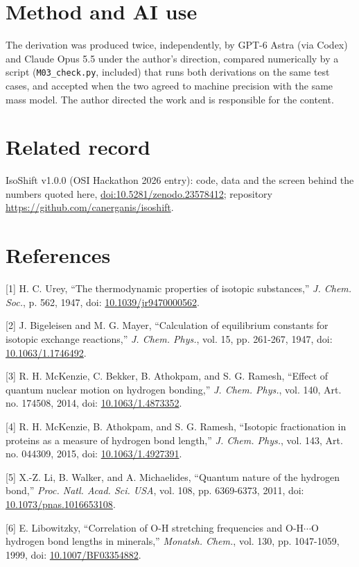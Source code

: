 \documentclass[11pt,a4paper]{article}
\begin{document}
\section*{Method and AI use}
The derivation was produced twice, independently, by GPT-6 Astra (via Codex) and Claude Opus 5.5 under the author's direction, compared numerically by a script (\texttt{M03\_check.py}, included) that runs both derivations on the same test cases, and accepted when the two agreed to machine precision with the same mass model. The author directed the work and is responsible for the content.

\section*{Related record}
IsoShift v1.0.0 (OSI Hackathon 2026 entry): code, data and the screen behind the numbers quoted here, \href{https://doi.org/10.5281/zenodo.23578412}{doi:10.5281/zenodo.23578412}; repository \url{https://github.com/canerganis/isoshift}.

\section*{References}
[1] H. C. Urey, ``The thermodynamic properties of isotopic substances,'' \emph{J. Chem. Soc.}, p. 562, 1947, doi: \href{https://doi.org/10.1039/jr9470000562}{10.1039/jr9470000562}.

[2] J. Bigeleisen and M. G. Mayer, ``Calculation of equilibrium constants for isotopic exchange reactions,'' \emph{J. Chem. Phys.}, vol. 15, pp. 261-267, 1947, doi: \href{https://doi.org/10.1063/1.1746492}{10.1063/1.1746492}.

[3] R. H. McKenzie, C. Bekker, B. Athokpam, and S. G. Ramesh, ``Effect of quantum nuclear motion on hydrogen bonding,'' \emph{J. Chem. Phys.}, vol. 140, Art. no. 174508, 2014, doi: \href{https://doi.org/10.1063/1.4873352}{10.1063/1.4873352}.

[4] R. H. McKenzie, B. Athokpam, and S. G. Ramesh, ``Isotopic fractionation in proteins as a measure of hydrogen bond length,'' \emph{J. Chem. Phys.}, vol. 143, Art. no. 044309, 2015, doi: \href{https://doi.org/10.1063/1.4927391}{10.1063/1.4927391}.

[5] X.-Z. Li, B. Walker, and A. Michaelides, ``Quantum nature of the hydrogen bond,'' \emph{Proc. Natl. Acad. Sci. USA}, vol. 108, pp. 6369-6373, 2011, doi: \href{https://doi.org/10.1073/pnas.1016653108}{10.1073/pnas.1016653108}.

[6] E. Libowitzky, ``Correlation of O-H stretching frequencies and O-H$\cdots$O hydrogen bond lengths in minerals,'' \emph{Monatsh. Chem.}, vol. 130, pp. 1047-1059, 1999, doi: \href{https://doi.org/10.1007/BF03354882}{10.1007/BF03354882}.
\end{document}
